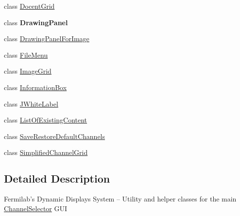 \begin{DoxyCompactItemize}
\item 
class \hyperlink{classgov_1_1fnal_1_1ppd_1_1dd_1_1changer_1_1DocentGrid}{Docent\-Grid}
\item 
class {\bfseries Drawing\-Panel}
\item 
class \hyperlink{classgov_1_1fnal_1_1ppd_1_1dd_1_1changer_1_1DrawingPanelForImage}{Drawing\-Panel\-For\-Image}
\item 
class \hyperlink{classgov_1_1fnal_1_1ppd_1_1dd_1_1changer_1_1FileMenu}{File\-Menu}
\item 
class \hyperlink{classgov_1_1fnal_1_1ppd_1_1dd_1_1changer_1_1ImageGrid}{Image\-Grid}
\item 
class \hyperlink{classgov_1_1fnal_1_1ppd_1_1dd_1_1changer_1_1InformationBox}{Information\-Box}
\item 
class \hyperlink{classgov_1_1fnal_1_1ppd_1_1dd_1_1changer_1_1JWhiteLabel}{J\-White\-Label}
\item 
class \hyperlink{classgov_1_1fnal_1_1ppd_1_1dd_1_1changer_1_1ListOfExistingContent}{List\-Of\-Existing\-Content}
\item 
class \hyperlink{classgov_1_1fnal_1_1ppd_1_1dd_1_1changer_1_1SaveRestoreDefaultChannels}{Save\-Restore\-Default\-Channels}
\item 
class \hyperlink{classgov_1_1fnal_1_1ppd_1_1dd_1_1changer_1_1SimplifiedChannelGrid}{Simplified\-Channel\-Grid}
\end{DoxyCompactItemize}


\subsection{Detailed Description}
Fermilab's Dynamic Displays System -- Utility and helper classes for the main \hyperlink{classgov_1_1fnal_1_1ppd_1_1dd_1_1ChannelSelector}{Channel\-Selector} G\-U\-I